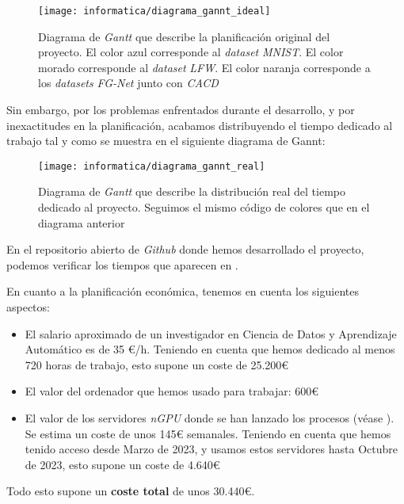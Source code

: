 \begin{figure}[H]
    \centering
    \texttt{[image: informatica/diagrama\_gannt\_ideal]}
    \caption{Diagrama de \textit{Gantt} que describe la planificación original del proyecto. El color azul corresponde al \textit{dataset} \textit{MNIST}. El color morado corresponde al \textit{dataset} \textit{LFW}. El color naranja corresponde a los \textit{datasets} \textit{FG-Net} junto con \textit{CACD}}
\end{figure}

Sin embargo, por los problemas enfrentados durante el desarrollo, y por inexactitudes en la planificación, acabamos distribuyendo el tiempo dedicado al trabajo tal y como se muestra en el siguiente diagrama de Gannt:

\begin{figure}[H]
    \centering
    \texttt{[image: informatica/diagrama\_gannt\_real]}
    \caption{Diagrama de \textit{Gantt} que describe la distribución real del tiempo dedicado al proyecto. Seguimos el mismo código de colores que en el diagrama anterior}
    \label{img:gannt_real}
\end{figure}

En el repositorio abierto de \textit{Github} \cite{informatica:repogithub} donde hemos desarrollado el proyecto, podemos verificar los tiempos que aparecen en .

En cuanto a la planificación económica, tenemos en cuenta los siguientes aspectos:

\begin{itemize}
    \item El salario aproximado de un investigador en Ciencia de Datos y Aprendizaje Automático es de 35 €/h. Teniendo en cuenta que hemos dedicado al menos 720 horas de trabajo, esto supone un coste de 25.200€
    \item El valor del ordenador que hemos usado para trabajar: 600€
    \item El valor de los servidores \textit{nGPU} donde se han lanzado los procesos (véase ). Se estima un coste de unos 145€ semanales. Teniendo en cuenta que hemos tenido acceso desde Marzo de 2023, y usamos estos servidores hasta Octubre de 2023, esto supone un coste de 4.640€
\end{itemize}

Todo esto supone un \textbf{coste total} de unos 30.440€.
